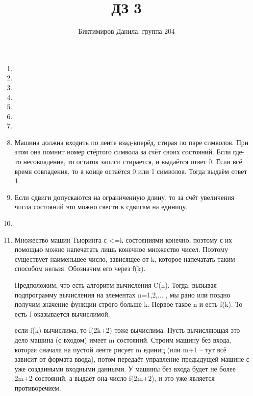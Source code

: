 \documentclass[11pt]{article}
\begin{document}
	
	\author{Биктимиров Данила, группа 204}
	\title{ДЗ 3}
	\date{}
	\maketitle
	
	\medskip
	
	\begin{enumerate}
		
		\item 
		\item 
		\item 
		\item 
		\item 
		\item 
		\item 
		\item Машина должна входить по ленте взад-вперёд, стирая по паре символов. При этом она помнит номер стёртого символа за счёт своих состояний. Если где-то несовпадение, то остаток записи стирается, и выдаётся ответ 0. Если всё время совпадения, то в конце остаётся 0 или 1 символов. Тогда выдаём ответ 1.
		\item  Если сдвиги допускаются на ограниченную длину, то за счёт увеличения числа состояний это можно свести к сдвигам на единицу.
		\item 
		\item Множество машин Тьюринга с <=k состояниями конечно, поэтому с их помощью можно напечатать лишь конечное множество чисел. Поэтому существует наименьшее число, зависящее от k, которое напечатать таким способом нельзя. Обозначим его через f(k).
		
		Предположим, что есть алгоритм вычисления C(n). Тогда, вызывая подпрограмму вычисления на элементах n=1,2,... , мы рано или поздно получим значение функции строго больше k. Первое такое n и есть f(k). То есть f оказывается вычислимой. 
		
		если f(k) вычислима, то f(2k+2) тоже вычислима. Пусть вычисляющая это дело машина (с входом) имеет m состояний. Строим машину без входа, которая сначала на пустой ленте рисует m единиц (или m+1 -- тут всё зависит от формата ввода), потом передаёт управление предыдущей машине с уже созданными входными данными. У машины без входа будет не более 2m+2 состояний, а выдаёт она число f(2m+2), и это уже является противоречием.
		
	\end{enumerate}
\end{document}
